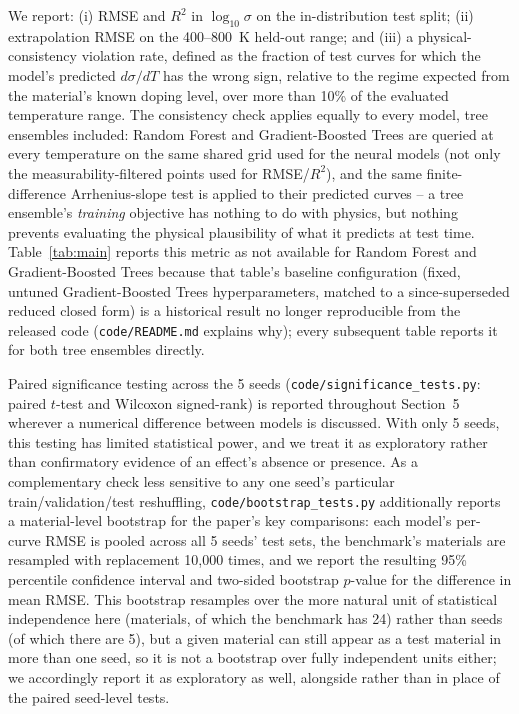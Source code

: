 \documentclass[11pt]{article}
\begin{document}
We report: (i) RMSE and $R^2$ in $\log_{10}\sigma$ on the in-distribution test split; (ii) extrapolation RMSE on the 400--800~K held-out range; and (iii) a physical-consistency violation rate, defined as the fraction of test curves for which the model's predicted $d\sigma/dT$ has the wrong sign, relative to the regime expected from the material's known doping level, over more than 10\% of the evaluated temperature range. The consistency check applies equally to every model, tree ensembles included: Random Forest and Gradient-Boosted Trees are queried at every temperature on the same shared grid used for the neural models (not only the measurability-filtered points used for RMSE/$R^2$), and the same finite-difference Arrhenius-slope test is applied to their predicted curves -- a tree ensemble's \emph{training} objective has nothing to do with physics, but nothing prevents evaluating the physical plausibility of what it predicts at test time. Table~\ref{tab:main} reports this metric as not available for Random Forest and Gradient-Boosted Trees because that table's baseline configuration (fixed, untuned Gradient-Boosted Trees hyperparameters, matched to a since-superseded reduced closed form) is a historical result no longer reproducible from the released code (\texttt{code/README.md} explains why); every subsequent table reports it for both tree ensembles directly.

Paired significance testing across the 5 seeds (\texttt{code/significance\_tests.py}: paired $t$-test and Wilcoxon signed-rank) is reported throughout Section~5 wherever a numerical difference between models is discussed. With only 5 seeds, this testing has limited statistical power, and we treat it as exploratory rather than confirmatory evidence of an effect's absence or presence. As a complementary check less sensitive to any one seed's particular train/validation/test reshuffling, \texttt{code/bootstrap\_tests.py} additionally reports a material-level bootstrap for the paper's key comparisons: each model's per-curve RMSE is pooled across all 5 seeds' test sets, the benchmark's materials are resampled with replacement 10{,}000 times, and we report the resulting 95\% percentile confidence interval and two-sided bootstrap $p$-value for the difference in mean RMSE. This bootstrap resamples over the more natural unit of statistical independence here (materials, of which the benchmark has 24) rather than seeds (of which there are 5), but a given material can still appear as a test material in more than one seed, so it is not a bootstrap over fully independent units either; we accordingly report it as exploratory as well, alongside rather than in place of the paired seed-level tests.
\end{document}
